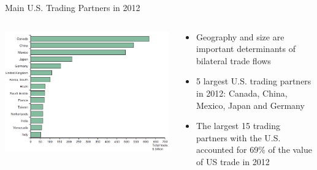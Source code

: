 \documentclass[10pt,hyperref={CJKbookmarks=true},xcolor=dvipsnames,aspectratio=169]{beamer}
\begin{document}
\begin{frame}{Main U.S. Trading Partners in 2012}


\begin{columns}[onlytextwidth]
	\begin{column}{0.60\textwidth}
		\includegraphics[width=\columnwidth]{fig/gravity/tra9}
		
		
	\end{column}
	\begin{column}{0.40\textwidth}
		
		
		\pause{}
		\begin{itemize}
			\item Geography and size are important determinants of bilateral trade flows
		\end{itemize}
		
		\pause{}
		\begin{itemize}
			\item 5 largest U.S. trading partners in 2012: Canada, China, Mexico, Japan
			and Germany 
		\end{itemize}
		
		\pause{}
		\begin{itemize}
			\item The largest 15 trading partners with the U.S. accounted for 69\% of
			the value of US trade in 2012
		\end{itemize}
		
	\end{column}
\end{columns}

\end{frame}
\end{document}
